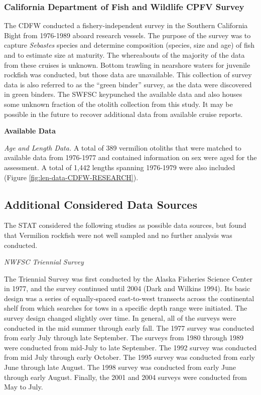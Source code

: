 \documentclass[
  english,
  a4paper,
]{article}
\begin{document}
\hypertarget{california-department-of-fish-and-wildlife-cpfv-survey}{%
\subsubsection{California Department of Fish and Wildlife CPFV Survey}\label{california-department-of-fish-and-wildlife-cpfv-survey}}

The CDFW conducted a fishery-independent survey in the Southern California Bight
from 1976-1989 aboard research vessels. The purpose of the survey
was to capture \emph{Sebastes} species and determine composition (species, size and age) of
fish and to estimate size at maturity. The whereabouts of the majority of the
data from these cruises is unknown. Bottom trawling in nearshore waters for juvenile
rockfish was conducted, but those data are unavailable.
This collection of survey data is also referred to as the
``green binder'' survey, as the data were discovered in green binders.
The SWFSC keypunched the available data and also houses some unknown fraction of the otolith collection from this study. It may be possible in the future to recover additional data from available cruise reports.

\textbf{Available Data}

\emph{Age and Length Data.}
A total of 389 vermilion otoliths that were matched to available
data from 1976-1977 and contained information on sex were aged for the assessment.
A total of 1,442 lengths spanning 1976-1979 were also included (Figure
\ref{fig:len-data-CDFW-RESEARCH}).

\hypertarget{additional-considered-data-sources}{%
\subsection{Additional Considered Data Sources}\label{additional-considered-data-sources}}

The STAT considered the following studies as possible data sources, but found that Vermilion rockfish were not well sampled and no further analysis was conducted.

\emph{NWFSC Triennial Survey}

The Triennial Survey was first conducted by the Alaska Fisheries Science Center in 1977, and the survey
continued until 2004 (Dark and Wilkins 1994).
Its basic design was a series of equally-spaced east-to-west transects across
the continental shelf from which searches for tows in a specific depth range were initiated.
The survey design changed slightly over time.
In general, all of the surveys were conducted in the mid summer through early fall.
The 1977 survey was conducted from early July through late September.
The surveys from 1980 through 1989 were conducted from mid-July to late September.
The 1992 survey was conducted from mid July through early October.
The 1995 survey was conducted from early June through late August.
The 1998 survey was conducted from early June through early August.
Finally, the 2001 and 2004 surveys were conducted from May to July.
\end{document}
